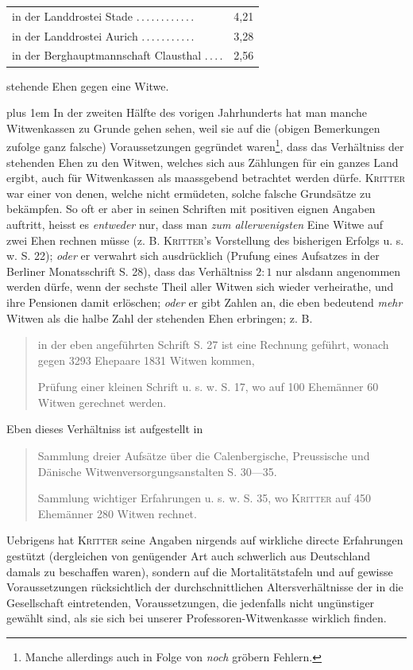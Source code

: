 \begin{center}
\begin{tabular}{l@{\;}r}
in der Landdrostei Stade .\,.\,.\,.\,.\,.\,.\,.\,.\,.\,.\,. & 4,21\\
in der Landdrostei Aurich .\,.\,.\,.\,.\,.\,.\,.\,.\,.\,. & 3,28\\
in der Berghauptmannschaft Clausthal .\,.\,.\,. & 2,56
\end{tabular}
\end{center}
\noindent stehende Ehen gegen eine Witwe.

{\rightskip=0pt plus 1em
In der zweiten Hälfte des vorigen Jahrhunderts hat man manche Witwenkassen zu Grunde gehen sehen, weil sie auf die (obigen Bemerkungen zufolge ganz falsche) Voraussetzungen gegründet waren\footnote{Manche allerdings auch in Folge von \textit{noch} gröbern Fehlern.}, dass das Verhältniss der stehenden Ehen zu den Witwen, welches sich aus Zählungen für ein ganzes Land ergibt, auch für Witwenkassen als maassgebend betrachtet werden dürfe. \textsc{Kritter} war einer von denen, welche nicht ermüdeten, solche falsche Grundsätze zu bekämpfen. So oft er aber in seinen Schriften mit positiven eignen Angaben auftritt, heisst es \textit{entweder} nur, dass man \textit{zum allerwenigsten} Eine Witwe auf zwei Ehen rechnen müsse (z. B. \textsc{Kritter}’s Vorstellung des bisherigen Erfolgs u. s. w. S. 22); \textit{oder} er verwahrt sich ausdrücklich (Prufung eines Aufsatzes in der Berliner Monatsschrift S. 28), dass das Verhältniss \(2:1\) nur alsdann angenommen werden dürfe, wenn der sechste Theil aller Witwen sich wieder verheirathe, und ihre Pensionen damit erlöschen; \textit{oder} er gibt Zahlen an, die eben bedeutend \textit{mehr} Witwen als die halbe Zahl der stehenden Ehen erbringen; z. B.\par}

\begin{quote}
in der eben angeführten Schrift S. 27 ist eine Rechnung geführt, wonach gegen 3293 Ehepaare 1831 Witwen kommen,

Prüfung einer kleinen Schrift u. s. w. S. 17, wo auf 100 Ehemänner 60 Witwen gerechnet werden.
\end{quote}
\noindent Eben dieses Verhältniss ist aufgestellt in
\begin{quote}
Sammlung dreier Aufsätze über die Calenbergische, Preussische und Dänische Witwenversorgungsanstalten S. 30—35.

Sammlung wichtiger Erfahrungen u. s. w. S. 35, wo \textsc{Kritter} auf 450 Ehemänner 280 Witwen rechnet.
\end{quote}
\noindent\hspace*{\parindent}Uebrigens hat \textsc{Kritter} seine Angaben nirgends auf wirkliche directe Erfahrungen gestützt (dergleichen von genügender Art auch schwerlich aus Deutschland damals zu beschaffen waren), sondern auf die Mortalitätstafeln und auf gewisse Voraussetzungen rücksichtlich der durchschnittlichen Altersverhältnisse der in die Gesellschaft eintretenden, Voraussetzungen, die jedenfalls nicht ungünstiger gewählt sind, als sie sich bei unserer Professoren-Witwenkasse wirklich finden.

